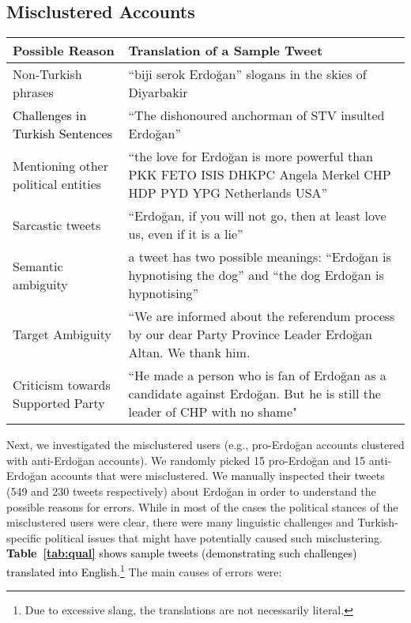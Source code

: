 \documentclass[letterpaper]{article} \usepackage{aaai20}  \usepackage{times}  \usepackage{stackengine}
\newcommand{\changes}{\textcolor{black}}
\begin{document}
\subsection{Misclustered Accounts}
\begin{table*}[!htp]
\scriptsize
    \centering
\begin{tabular}{p{3.4cm}|p{12.6cm}}
    \textbf{Possible Reason}  &  \textbf{Translation of a Sample Tweet} \\ \hline
    Non-Turkish phrases  & ``biji serok Erdo\u{g}an'' slogans in the skies of Diyarbakir   \\ \hline
  \changes{Challenges in Turkish Sentences}& ``The dishonoured anchorman of STV insulted Erdo\u{g}an'' \\ \hline
Mentioning other political entities& ``the love for Erdo\u{g}an is more powerful than  PKK FETO ISIS DHKPC Angela Merkel CHP HDP PYD YPG Netherlands USA'' \\ \hline
Sarcastic tweets &  ``Erdo\u{g}an, if you will not go, then at least love us, even if it is a lie'' \\ \hline
Semantic ambiguity &  a tweet has two possible meanings: ``Erdo\u{g}an is hypnotising the dog'' and ``the dog Erdo\u{g}an is hypnotising'' \\ \hline
Target Ambiguity & ``We are informed about the referendum process by our dear Party Province Leader Erdo\u{g}an Altan. We thank him.\\ \hline Criticism towards Supported Party &  ``He made a person who is fan of Erdo\u{g}an as a candidate against Erdo\u{g}an. But he is still the leader of CHP with no shame" \\ \hline \end{tabular}
\caption{Possible reasons of misclustering with examples.}
    \label{tab:qual}
\end{table*}

Next, we investigated the misclustered users (e.g., pro-Erdo\u{g}an accounts clustered with anti-Erdo\u{g}an accounts). We randomly picked 15 pro-Erdo\u{g}an and 15 anti-Erdo\u{g}an accounts that were misclustered. We manually inspected their tweets (549 and 230 tweets respectively) about Erdo\u{g}an in order to understand the possible reasons for errors. While in most of the cases the political stances of the misclustered users were clear, there were many linguistic challenges and Turkish-specific political issues that might have potentially caused such misclustering. \changes{\textbf{Table~\ref{tab:qual}} shows sample tweets (demonstrating such challenges) translated into English.\footnote{Due to excessive slang, the translations are not necessarily literal.}}
The main causes of errors were:
\end{document}

